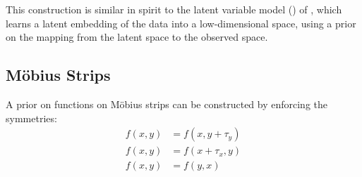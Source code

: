 This construction is similar in spirit to the \gp{} latent variable model (\gplvm{}) of \citet{lawrence2005probabilistic}, which learns a latent embedding of the data into a low-dimensional space, using a \gp{} prior on the mapping from the latent space to the observed space.%





\subsection{M\"{o}bius Strips}

A prior on functions on M\"{o}bius strips can be constructed by enforcing the symmetries:
%
\begin{align}
f(x, y) & = f( x, y + \tau_y) \\
f(x, y) & = f( x + \tau_x, y)  \\
f(x, y) & = f( y, x )
\end{align}

